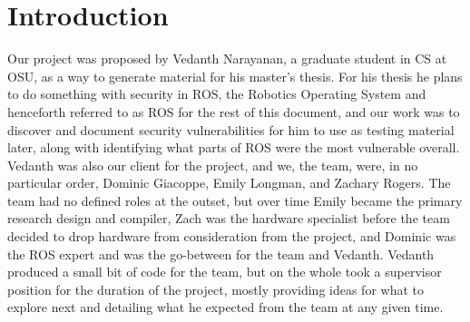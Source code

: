 \documentclass[IEEEtran,letterpaper,10pt,notitlepage,draftclsnofoot,onecolumn]{article}
\begin{document}
\section{Introduction}
Our project was proposed by Vedanth Narayanan, a graduate student in CS at 
OSU, as a way to generate material for his master’s thesis. For his thesis 
he plans to do something with security in ROS, the Robotics Operating System 
and henceforth referred to as ROS for the rest of this document, and our 
work was to discover and document security vulnerabilities for him to use as 
testing material later, along with identifying what parts of ROS were the most 
vulnerable overall. Vedanth was also our client for the project, and we, the team, 
were, in no particular order, Dominic Giacoppe, Emily Longman, and Zachary Rogers. 
The team had no defined roles at the outset, but over time Emily became the primary 
research design and compiler, Zach was the hardware specialist before the team 
decided to drop hardware from consideration from the project, and Dominic was the 
ROS expert and was the go-between for the team and Vedanth. Vedanth produced a 
small bit of code for the team, but on the whole took a supervisor position for 
the duration of the project, mostly providing ideas for what to explore next 
and detailing what he expected from the team at any given time. 
\end{document}
